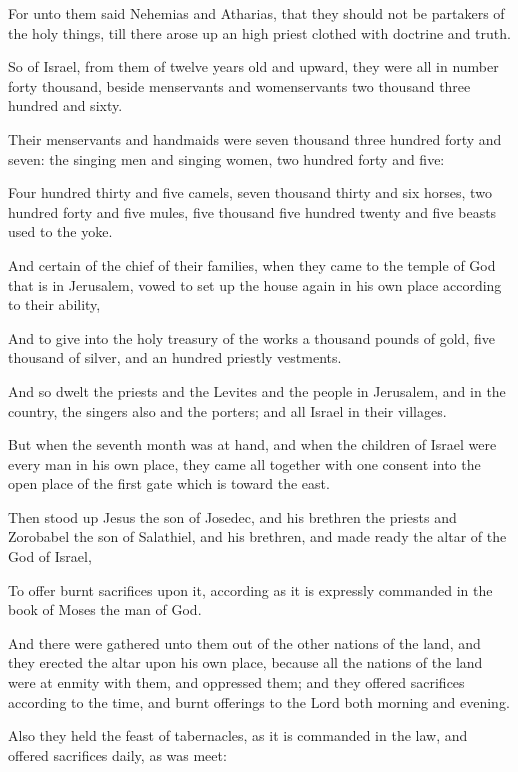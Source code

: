 {\par }{\PP {}For unto them said Nehemias and Atharias, that they should not be partakers of the holy things, till there arose up an high priest clothed with doctrine and truth.
\par }{\PP {}So of Israel, from them of twelve years old and upward, they were all in number forty thousand, beside menservants and womenservants two thousand three hundred and sixty.
\par }{\PP {}Their menservants and handmaids were seven thousand three hundred forty and seven: the singing men and singing women, two hundred forty and five:
\par }{\PP {}Four hundred thirty and five camels, seven thousand thirty and six horses, two hundred forty and five mules, five thousand five hundred twenty and five beasts used to the yoke.
\par }{\PP {}And certain of the chief of their families, when they came to the temple of God that is in Jerusalem, vowed to set up the house again in his own place according to their ability,
\par }{\PP {}And to give into the holy treasury of the works a thousand pounds of gold, five thousand of silver, and an hundred priestly vestments.
\par }{\PP {}And so dwelt the priests and the Levites and the people in Jerusalem, and in the country, the singers also and the porters; and all Israel in their villages.
\par }{\PP {}But when the seventh month was at hand, and when the children of Israel were every man in his own place, they came all together with one consent into the open place of the first gate which is toward the east.
\par }{\PP {}Then stood up Jesus the son of Josedec, and his brethren the priests and Zorobabel the son of Salathiel, and his brethren, and made ready the altar of the God of Israel,
\par }{\PP {}To offer burnt sacrifices upon it, according as it is expressly commanded in the book of Moses the man of God.
\par }{\PP {}And there were gathered unto them out of the other nations of the land, and they erected the altar upon his own place, because all the nations of the land were at enmity with them, and oppressed them; and they offered sacrifices according to the time, and burnt offerings to the Lord both morning and evening.
\par }{\PP {}Also they held the feast of tabernacles, as it is commanded in the law, and offered sacrifices daily, as was meet:
}
